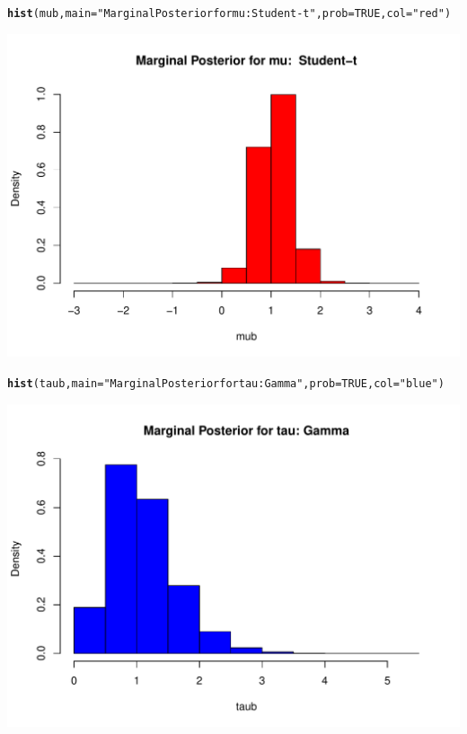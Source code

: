 \documentclass[12pt, a4paper, oneside]{article}\usepackage{graphicx, color}
\makeatletter
\def\maxwidth{ %
  \ifdim\Gin@nat@width>\linewidth
    \linewidth
  \else
    \Gin@nat@width
  \fi
}
\newcommand{\hlfunctioncall}[1]{\textcolor[rgb]{0.501960784313725,0,0.329411764705882}{\textbf{#1}}}%
\newcommand{\hlstring}[1]{\textcolor[rgb]{0.6,0.6,1}{#1}}%
\newenvironment{kframe}{%
 \def\at@end@of@kframe{}%
 \ifinner\ifhmode%
  \def\at@end@of@kframe{\end{minipage}}%
  \begin{minipage}{\columnwidth}%
 \fi\fi%
 \def\FrameCommand##1{\hskip\@totalleftmargin \hskip-\fboxsep
 \colorbox{shadecolor}{##1}\hskip-\fboxsep
     \hskip-\linewidth \hskip-\@totalleftmargin \hskip\columnwidth}%
 \MakeFramed {\advance\hsize-\width
   \@totalleftmargin\z@ \linewidth\hsize
   \@setminipage}}%
 {\par\unskip\endMakeFramed%
 \at@end@of@kframe}
\newenvironment{knitrout}{}{} %
\makeatother
\begin{document}
\begin{knitrout}
\color{fgcolor}\begin{kframe}
\begin{alltt}
\hlfunctioncall{hist}(mub, main = \hlstring{"Marginal Posterior for mu:  Student-t"}, prob = TRUE, col = \hlstring{"red"})
\end{alltt}
\end{kframe}
\includegraphics[width=\maxwidth]{figure/MCMCplot1} 
\begin{kframe}\begin{alltt}
\hlfunctioncall{hist}(taub, main = \hlstring{"Marginal Posterior for tau: Gamma"}, prob = TRUE, col = \hlstring{"blue"})
\end{alltt}
\end{kframe}
\includegraphics[width=\maxwidth]{figure/MCMCplot2} 

\end{knitrout}
\end{document}
